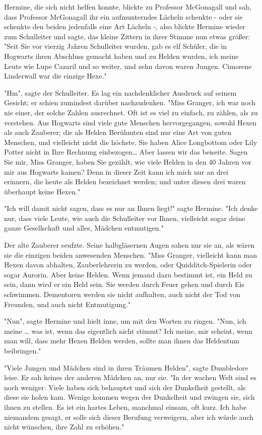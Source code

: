 {Hermine, die sich nicht helfen konnte, blickte zu Professor McGonagall und sah, dass Professor McGonagall ihr ein aufmunterndes Lächeln schenkte - oder sie schenkte den beiden jedenfalls eine Art Lächeln -, also blickte Hermine wieder zum Schulleiter und sagte, das kleine Zittern in ihrer Stimme nun etwas größer: "Seit Sie vor vierzig Jahren Schulleiter wurden, gab es elf Schüler, die in Hogwarts ihren Abschluss gemacht haben und zu Helden wurden, ich meine Leute wie Lupe Cazaril und so weiter, und zehn davon waren Jungen. Cimorene Linderwall war die einzige Hexe."

"Hm", sagte der Schulleiter. Es lag ein nachdenklicher Ausdruck auf seinem Gesicht; er schien zumindest darüber nachzudenken. "Miss Granger, ich war noch nie einer, der solche Zahlen ausrechnet. Oft ist es viel zu einfach, zu zählen, als zu verstehen. Aus Hogwarts sind viele gute Menschen hervorgegangen, sowohl Hexen als auch Zauberer; die als Helden Berühmten sind nur eine Art von guten Menschen, und vielleicht nicht die höchste. Sie haben Alice Longbottom oder Lily Potter nicht in Ihre Rechnung einbezogen… Aber lassen wir das beiseite. Sagen Sie mir, Miss Granger, haben Sie gezählt, wie viele Helden in den 40 Jahren vor mir aus Hogwarts kamen? Denn in dieser Zeit kann ich mich nur an drei erinnern, die heute als Helden bezeichnet werden; und unter diesen drei waren überhaupt keine Hexen."

"Ich will damit nicht sagen, dass es nur an Ihnen liegt!" sagte Hermine. "Ich denke nur, dass viele Leute, wie auch die Schulleiter vor Ihnen, vielleicht sogar deine ganze Gesellschaft und alles, Mädchen entmutigen."

Der alte Zauberer seufzte. Seine halbgläsernen Augen sahen nur sie an, als wären sie die einzigen beiden anwesenden Menschen. "Miss Granger, vielleicht kann man Hexen davon abhalten, Zauberlehrerin zu werden, oder Quidditch-Spielerin oder sogar Aurorin. Aber keine Helden. Wenn jemand dazu bestimmt ist, ein Held zu sein, dann wird er ein Held sein. Sie werden durch Feuer gehen und durch Eis schwimmen. Dementoren werden sie nicht aufhalten, auch nicht der Tod von Freunden, und auch nicht Entmutigung."

"Nun", sagte Hermine und hielt inne, um mit den Worten zu ringen. "Nun, ich meine … was ist, wenn das eigentlich nicht stimmt? Ich meine, mir scheint, wenn man will, dass mehr Hexen Helden werden, sollte man ihnen das Heldentum beibringen."

"Viele Jungen und Mädchen sind in ihren Träumen Helden", sagte Dumbledore leise. Er sah keines der anderen Mädchen an, nur sie. "In der wachen Welt sind es noch weniger. Viele haben sich behauptet und sich der Dunkelheit gestellt, als diese sie holen kam. Wenige kommen wegen der Dunkelheit und zwingen sie, sich ihnen zu stellen. Es ist ein hartes Leben, manchmal einsam, oft kurz. Ich habe niemandem gesagt, er solle sich dieser Berufung verweigern, aber ich würde auch nicht wünschen, ihre Zahl zu erhöhen."

}
